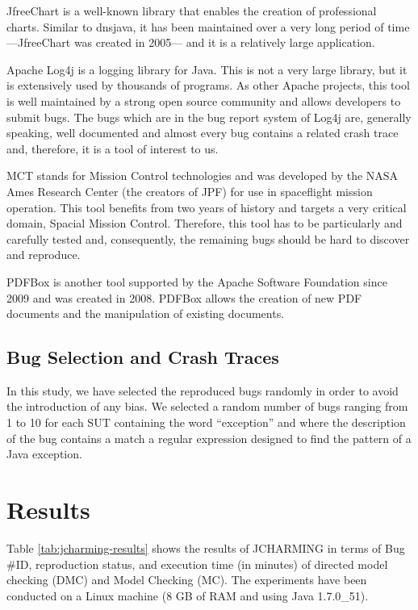 JfreeChart \cite{ObjectRefineryLimited2005} is a well-known library that enables the
creation of professional charts. Similar to dnsjava, it has been
maintained over a very long period of time —JfreeChart was
created in 2005— and it is a relatively large application.

Apache Log4j \cite{TheApacheSoftwareFoundation1999} is a logging library for Java. This is not a
very large library, but it is extensively used by thousands of
programs. As other Apache projects, this tool is well
maintained by a strong open source community and allows
developers to submit bugs. The bugs which are in the bug
report system of Log4j are, generally speaking, well
documented and almost every bug contains a related crash
trace and, therefore, it is a tool of interest to us.

MCT \cite{NASA2009} stands for Mission Control technologies and was
developed by the NASA Ames Research Center (the creators
of JPF) for use in spaceflight mission operation. This tool
benefits from two years of history and targets a very critical
domain, Spacial Mission Control. Therefore, this tool has to
be particularly and carefully tested and, consequently, the
remaining bugs should be hard to discover and reproduce.

PDFBox \cite{ApacheSoftwareFoundation2014} is another tool supported by the Apache
Software Foundation since 2009 and was created in 2008.
PDFBox allows the creation of new PDF documents and the
manipulation of existing documents.

\subsection{Bug Selection and Crash Traces}

In this study, we have selected the reproduced bugs randomly
in order to avoid the introduction of any bias. We selected a
random number of bugs ranging from 1 to 10 for each SUT
containing the word ``exception'' and where the description of
the bug contains a match a regular expression designed to find the pattern of a
Java exception.

\section{Results}

Table \ref{tab:jcharming-results} shows the results of JCHARMING in terms of Bug
\#ID, reproduction status, and execution time (in minutes) of
directed model checking (DMC) and Model Checking (MC).
The experiments have been conducted on a Linux machine (8
GB of RAM and using Java 1.7.0\_51).

